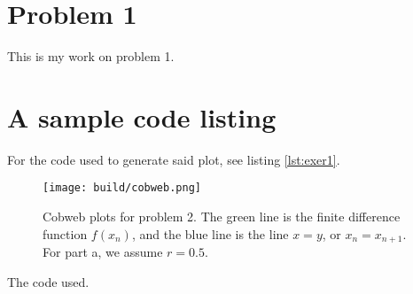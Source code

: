 \documentclass{article}
\begin{document}
\maketitle

\begin{multicols}{2}
\section*{Problem 1}
This is my work on problem 1.

\section*{A sample code listing}
For the code used to generate said plot, see
listing \ref{lst:exer1}.

\end{multicols}

\begin{figure}
  \centering
  \texttt{[image: build/cobweb.png]}
  \caption{
    Cobweb plots for problem 2.
    The green line is the finite difference function $f(x_n)$, and the blue
    line is the line $x=y$, or $x_n = x_{n+1}$.
    For part a, we assume $r=0.5$.
  }
  \label{fig:cobweb}
\end{figure}

\begin{listing}[ht]
   \begin{framed}
    
    \caption{The code used.}
    \label{lst:exer1}
   \end{framed}
\end{listing}
\end{document}

